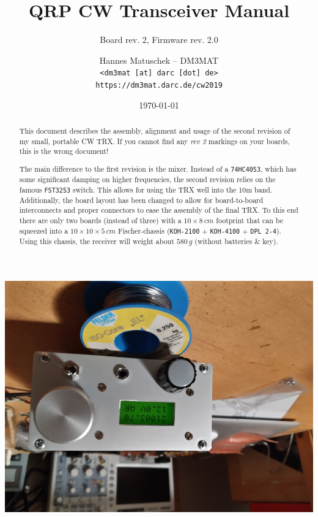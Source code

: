 \documentclass[10pt, a4paper,twoside]{scrartcl}
\title{QRP CW Transceiver Manual}
\subtitle{Board rev. 2, Firmware rev. 2.0}
\author{Hannes Matuschek -- DM3MAT\\\texttt{<dm3mat [at] darc [dot] de>}\\\texttt{https://dm3mat.darc.de/cw2019}}
\date{\today}
\begin{document}
\maketitle

\begin{abstract}
This document describes the assembly, alignment and usage of the second revision of my small, portable CW TRX. If you cannot find any \emph{rev 2} markings on your boards, this is the wrong document!

The main difference to the first revision is the mixer. Instead of a \texttt{74HC4053}, which has some significant damping on higher frequencies, the second revision relies on the famous \texttt{FST3253} switch. This allows for using the TRX well into the 10m band. Additionally, the board layout has been changed to allow for board-to-board interconnects and proper connectors to ease the assembly of the final TRX. To this end there are only two boards (instead of three) with a $10\times 8\,cm$ footprint that can be squeezed into a $10 \times 10\times 5\,cm$ Fischer-chassis (\texttt{KOH-2100} + \texttt{KOH-4100} + \texttt{DPL 2-4}).  Using this chassis, the receiver will weight about $580\,g$ (without batteries \& key).
\end{abstract}
\thispagestyle{empty}
\vfill
\begin{center}
 \includegraphics[width=0.7\linewidth]{fig/complete_small.png}
\end{center}



\cleardoublepage
\tableofcontents
\thispagestyle{empty}

\cleardoublepage
\end{document}
